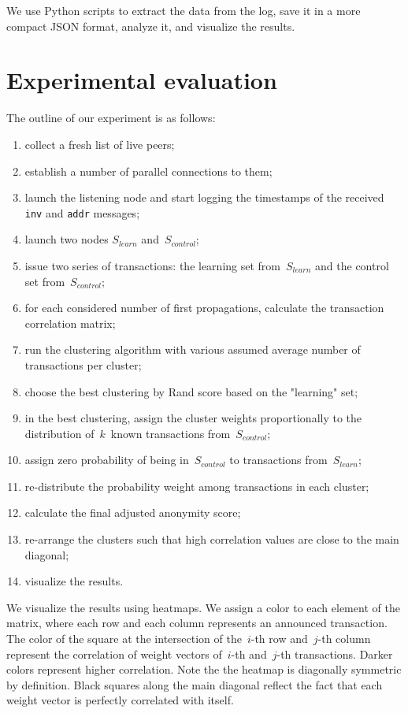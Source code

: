 We use Python scripts to extract the data from the log, save it in a more compact JSON format, analyze it, and visualize the results.

\section{Experimental evaluation}

The outline of our experiment is as follows:

\begin{enumerate}
	\item collect a fresh list of live peers;
	\item establish a number of parallel connections to them;
	\item launch the listening node and start logging the timestamps of the received \texttt{inv} and \texttt{addr} messages;
	\item launch two nodes $S_{learn}$ and~$S_{control}$;%
	\item issue two series of transactions: the learning set from~$S_{learn}$ and the control set from~$S_{control}$;
	\item for each considered number of first propagations, calculate the transaction correlation matrix;
	\item run the clustering algorithm with various assumed average number of transactions per cluster;
	\item choose the best clustering by Rand score based on the "learning" set;
	\item in the best clustering, assign the cluster weights proportionally to the distribution of~$k$~known transactions from~$S_{control}$;
	\item assign zero probability of being in~$S_{control}$ to transactions from~$S_{learn}$;
	\item re-distribute the probability weight among transactions in each cluster;
	\item calculate the final adjusted anonymity score;
	\item re-arrange the clusters such that high correlation values are close to the main diagonal;
	\item visualize the results.
\end{enumerate}

We visualize the results using heatmaps.
We assign a color to each element of the matrix, where each row and each column represents an announced transaction.
The color of the square at the intersection of the~$i$-th row and~$j$-th column represent the correlation of weight vectors of~$i$-th and~$j$-th transactions.
Darker colors represent higher correlation.
Note the the heatmap is diagonally symmetric by definition.
Black squares along the main diagonal reflect the fact that each weight vector is perfectly correlated with itself.

